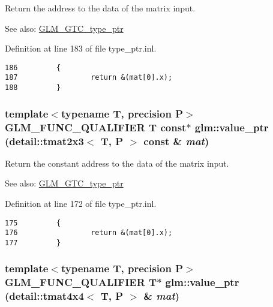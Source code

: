 Return the address to the data of the matrix input. \begin{Desc}
\item[See also:]\hyperlink{group__gtc__type__ptr}{GLM\_\-GTC\_\-type\_\-ptr} \end{Desc}


Definition at line 183 of file type\_\-ptr.inl.

\begin{Code}\begin{verbatim}186         {
187                 return &(mat[0].x);
188         }
\end{verbatim}
\end{Code}


\hypertarget{group__gtc__type__ptr_g76ad4707fac9af56b7eaea2c9b6019fb}{
\subsubsection[value\_\-ptr]{\setlength{\rightskip}{0pt plus 5cm}template$<$typename T, precision P$>$ GLM\_\-FUNC\_\-QUALIFIER T const$\ast$ glm::value\_\-ptr (detail::tmat2x3$<$ T, P $>$ const \& {\em mat})}}
\label{group__gtc__type__ptr_g76ad4707fac9af56b7eaea2c9b6019fb}


Return the constant address to the data of the matrix input. \begin{Desc}
\item[See also:]\hyperlink{group__gtc__type__ptr}{GLM\_\-GTC\_\-type\_\-ptr} \end{Desc}


Definition at line 172 of file type\_\-ptr.inl.

\begin{Code}\begin{verbatim}175         {
176                 return &(mat[0].x);
177         }
\end{verbatim}
\end{Code}


\hypertarget{group__gtc__type__ptr_g5f34b63d9c6322a3a61f15ee63768304}{
\subsubsection[value\_\-ptr]{\setlength{\rightskip}{0pt plus 5cm}template$<$typename T, precision P$>$ GLM\_\-FUNC\_\-QUALIFIER T$\ast$ glm::value\_\-ptr (detail::tmat4x4$<$ T, P $>$ \& {\em mat})}}
\label{group__gtc__type__ptr_g5f34b63d9c6322a3a61f15ee63768304}


